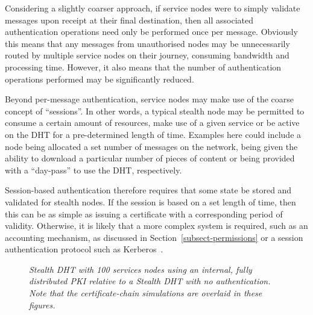 \documentclass[pdftex,conference,10pt]{IEEEtran}
\begin{document}
Considering a slightly coarser approach, if service nodes were to
simply validate messages upon receipt at their final destination, then
all associated authentication operations need only be performed once
per message. Obviously this means that any messages from unauthorised
nodes may be unnecessarily routed by multiple service nodes on their
journey, consuming bandwidth and processing time. However, it also
means that the number of authentication operations performed may be
significantly reduced.

Beyond per-message authentication, service nodes may make use of the
coarse concept of ``sessions''. In other words, a typical stealth node
may be permitted to consume a certain amount of resources, make use of
a given service or be active on the DHT for a pre-determined length of
time. Examples here could include a node being allocated a set number
of messages on the network, being given the ability to download a
particular number of pieces of content or being provided with a
``day-pass'' to use the DHT, respectively.

Session-based authentication therefore requires that some state be
stored and validated for stealth nodes. If the session is based on a
set length of time, then this can be as simple as issuing a certificate
with a corresponding period of validity. Otherwise, it is likely that a
more complex system is required, such as an accounting mechanism, as
discussed in Section~\ref{subsect-permissions} or a session
authentication protocol such as Kerberos~\cite{Neuman94Kerberos}.

\begin{figure}[tb]
\center
{}
\caption{\em Stealth DHT with 100 services nodes using an internal,
fully distributed PKI relative to a Stealth DHT with no authentication.
Note that the certificate-chain simulations are overlaid in these figures.}
\label{fig-granularities}
\end{figure}
\end{document}

